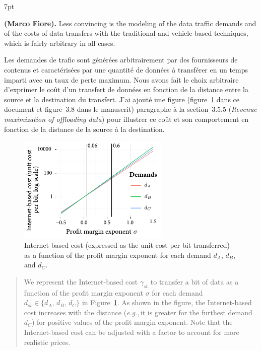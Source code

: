 \documentclass[11pt]{article}
\newcommand{\eg}{\textit{e.g.},\,}
\newenvironment{formal}{%
  \vspace*{-5pt}
  \def\FrameCommand{%
    \hspace{-5pt}%
    {\color{gray50}\vrule width 1.25pt}%
    \colorbox{formalcolor}%
  }%
  \MakeFramed{\advance\hsize-\width\FrameRestore}%
  \noindent\hspace{-4.55pt}%
  \begin{adjustwidth}{}{7pt}%
  \normalsize
  \vspace{-2pt}
}
{%
  \vspace{2pt}\end{adjustwidth}\endMakeFramed%
  \vspace*{-10pt}
}
\begin{document}
\begin{formal}
\textbf{(Marco Fiore).} Less convincing is the modeling of the data traffic demands and of the costs of data transfers with the traditional and vehicle-based techniques, which is fairly arbitrary in all cases.
\end{formal}

Les demandes de trafic sont générées arbitrairement par des fournisseurs de contenus et caractérisées par une quantité de données à transférer en un temps imparti avec un taux de perte maximum. Nous avons fait le choix arbitraire d'exprimer le coût d'un transfert de données en fonction de la distance entre la source et la destination du transfert. J'ai ajouté une figure (figure~\ref{fig:demand-price-km} dans ce document et figure~3.8 dans le manuscrit) paragraphe à la section~3.5.5 (\textit{Revenue maximization of offloading data}) pour illustrer ce coût et son comportement en fonction de la distance de la source à la destination.

\begin{figure}[h!]
    \centering
    \includegraphics[width=7.2cm]{results/ton-demand-price-km.pdf}
    \caption{Internet-based cost (expressed as the unit cost per bit transferred) as a function of the profit margin exponent for each demand $d_A$, $d_B$, and $d_C$.}
    \label{fig:demand-price-km}
\end{figure}

\begin{quote}
We represent the Internet-based cost $\gamma_{st}$ to transfer a bit of data as a function of the profit margin exponent $\sigma$ for each demand $d_{st}\in\{d_A,\,d_B,\,d_C\}$ in Figure~\ref{fig:demand-price-km}. As shown in the figure, the Internet-based cost increases with the distance (\eg it is greater for the furthest demand $d_C$) for positive values of the profit margin exponent. Note that the Internet-based cost can be adjusted with a factor to account for more realistic prices.
\end{quote}
\end{document}
